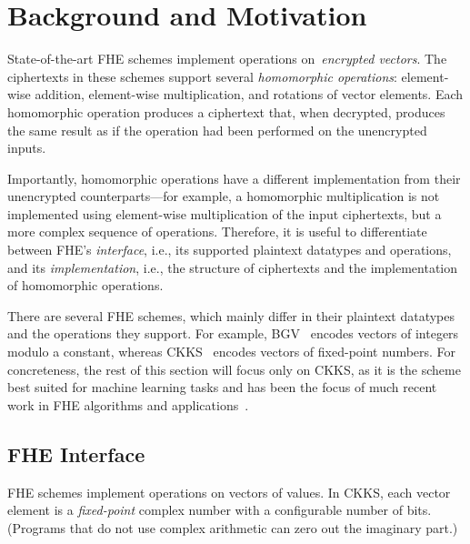 \section{Background and Motivation}\label{sec:background}

\figBreakdown

State-of-the-art %
FHE schemes implement operations on~\emph{encrypted vectors}.
The ciphertexts in these schemes support several \emph{homomorphic operations}:
element-wise addition, element-wise multiplication,
and rotations of vector elements.
Each homomorphic operation produces a ciphertext that, when decrypted,
produces the same result as if the operation had been performed on the unencrypted inputs.

Importantly, homomorphic operations have a different implementation from their unencrypted counterparts---for example,
a homomorphic multiplication is not implemented using element-wise multiplication
of the input ciphertexts, but a more complex
sequence of operations. Therefore, it is useful to differentiate between FHE's \emph{interface},
i.e., its supported plaintext datatypes and operations,
and its \emph{implementation},
i.e., the structure of ciphertexts and the implementation of homomorphic operations.

There are several FHE schemes, which mainly differ in their plaintext datatypes and the operations they support.
For example, BGV~\cite{brakerski:toct14:leveled} encodes vectors of integers modulo a constant,
whereas CKKS~\cite{cheon:ictaci17:homomorphic} encodes vectors of fixed-point numbers.
For concreteness, the rest of this section will focus only on CKKS, as it
is the scheme best suited for machine learning tasks and has been the focus of
much recent work in FHE algorithms and applications~\cite{han:iacr18:efficient,lee:2021:privacy,gilad:icml16:cryptonets,podschwadt:2020:classification,dathathri:pldi19:chet,dathathri:pldi20:eva,bossuat:eurocrypt21:efficient}.

\subsection{FHE Interface}

FHE schemes implement operations on vectors of values.
In CKKS, each vector element is a \emph{fixed-point} complex number with a configurable number of bits.
(Programs that do not use complex arithmetic can zero out the imaginary part.)

